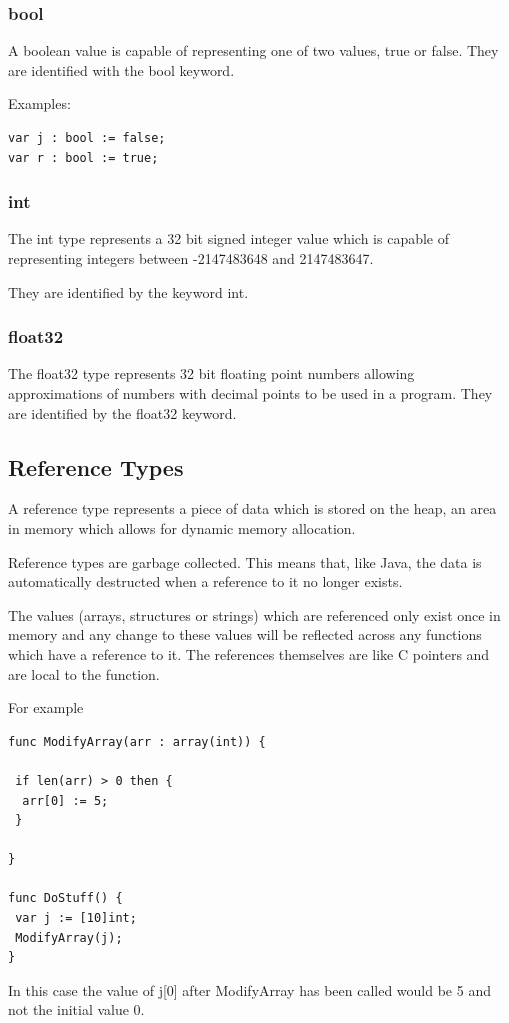\documentclass[]{final_report}
\begin{document}
\subsubsection{bool}

A boolean value is capable of representing one of two values, true or false. They are identified with the bool keyword.

Examples:
\begin{verbatim}
var j : bool := false;
var r : bool := true;
\end{verbatim}

\subsubsection{int}

The int type represents a 32 bit signed integer value which is capable of representing integers between -2147483648 and 2147483647.

They are identified by the keyword int. 

\subsubsection{float32}

The float32 type represents 32 bit floating point numbers allowing approximations of numbers with decimal points to be used in a program. They are identified by the float32 keyword.

\subsection{Reference Types}

A reference type represents a piece of data which is stored on the heap, an area in memory which allows for dynamic memory allocation.

Reference types are garbage collected. This means that, like Java, the data is automatically destructed when a reference to it no longer exists.

The values (arrays, structures or strings) which are referenced only exist once in memory and any change to these values will be reflected across any functions which have a reference to it. The references themselves are like C pointers and are local to the function.

For example
\begin{verbatim}
func ModifyArray(arr : array(int)) {

 if len(arr) > 0 then {
  arr[0] := 5;
 }

}

func DoStuff() {
 var j := [10]int;
 ModifyArray(j);
}
\end{verbatim}
In this case the value of j[0] after ModifyArray has been called would be 5 and not the initial value 0.
\end{document}
